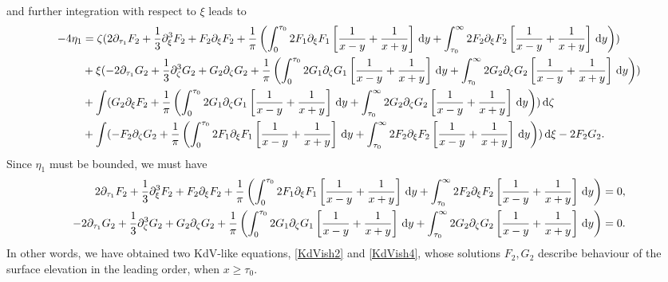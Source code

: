 \documentclass[10pt,reqno,oneside,a4paper, landscape]{article}
\begin{document}
and further integration with respect to $\xi$ leads to
\begin{align*}
- 4\eta_{1} &= \zeta (2 \partial_{\tau_1}F_2 + \frac{1}{3} \partial_\xi^3 F_2 + F_2\partial_\xi F_2 + \frac{1}{\pi} \left( \int_0^{\tau_0} 2 F_1  \partial_\xi F_1 \left[ \frac{1}{x-y} + \frac{1}{x+y} \right] \,\mathrm{d} y +\int_{\tau_0}^\infty 2 F_2 \partial_\xi F_2\left[ \frac{1}{x-y} + \frac{1}{x+y} \right] \,\mathrm{d} y \right) ) \\
&+\xi (- 2 \partial_{\tau_1} G_2 +  \frac{1}{3} \partial_\zeta^3 G_2+ G_2 \partial_{\zeta} G_2  + \frac{1}{\pi} \left( \int_0^{\tau_0}  2 G_1 \partial_\zeta G_1 \left[ \frac{1}{x-y} + \frac{1}{x+y} \right] \,\mathrm{d} y +\int_{\tau_0}^\infty 2 G_2 \partial_\zeta G_2 \left[ \frac{1}{x-y} + \frac{1}{x+y} \right] \,\mathrm{d} y \right) )\\
&+ \int (G_2 \partial_\xi F_2 + \frac{1}{\pi} \left( \int_0^{\tau_0} 2 G_1 \partial_\zeta G_1 \left[ \frac{1}{x-y} + \frac{1}{x+y} \right] \,\mathrm{d} y +\int_{\tau_0}^\infty 2 G_2 \partial_\zeta G_2 \left[ \frac{1}{x-y} + \frac{1}{x+y} \right] \,\mathrm{d} y \right) )\,\mathrm{d} \zeta \\
&+\int (-F_2\partial_\zeta G_2 + \frac{1}{\pi} \left( \int_0^{\tau_0} 2 F_1  \partial_\xi F_1 \left[ \frac{1}{x-y} + \frac{1}{x+y} \right] \,\mathrm{d} y +\int_{\tau_0}^\infty 2 F_2 \partial_\xi F_2  \left[ \frac{1}{x-y} + \frac{1}{x+y} \right] \,\mathrm{d} y \right))\,\mathrm{d} \xi - 2 F_2 G_2. 
\end{align*}
Since $\eta_1$ must be bounded, we must have 
\begin{align}
2 \partial_{\tau_1}F_2 + \frac{1}{3} \partial_\xi^3 F_2 + F_2\partial_\xi F_2 + \frac{1}{\pi} \left( \int_0^{\tau_0} 2 F_1  \partial_\xi F_1 \left[ \frac{1}{x-y} + \frac{1}{x+y} \right] \,\mathrm{d} y +\int_{\tau_0}^\infty 2 F_2 \partial_\xi F_2\left[ \frac{1}{x-y} + \frac{1}{x+y} \right] \,\mathrm{d} y \right) &= 0 \label{KdVish2}, \\
- 2 \partial_{\tau_1} G_2 +  \frac{1}{3} \partial_\zeta^3 G_2+ G_2 \partial_{\zeta} G_2  + \frac{1}{\pi} \left( \int_0^{\tau_0}  2 G_1 \partial_\zeta G_1 \left[ \frac{1}{x-y} + \frac{1}{x+y} \right] \,\mathrm{d} y +\int_{\tau_0}^\infty 2 G_2 \partial_\zeta G_2 \left[ \frac{1}{x-y} + \frac{1}{x+y} \right] \,\mathrm{d} y \right) &= 0. \label{KdVish4}
\end{align}
In other words, we have obtained two KdV-like equations, \eqref{KdVish2} and \eqref{KdVish4}, whose solutions $F_2, G_2$ describe behaviour of the surface elevation in the leading order, when $x\geq \tau_0.$
\end{document}
